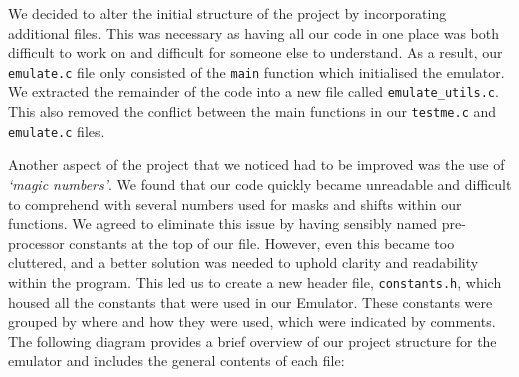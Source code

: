 \documentclass[10pt]{article}
\begin{document}
We decided to alter the initial structure of the project by incorporating additional files. This was necessary as having all our code in one place was both difficult to work on and difficult for someone else to understand. As a result, our {\tt emulate.c} file only consisted of the {\tt main} function which initialised the emulator. We extracted the remainder of the code into a new file called {\tt emulate\_utils.c}. This also removed the conflict between the main functions in our {\tt testme.c} and {\tt emulate.c} files.
 

Another aspect of the project that we noticed had to be improved was the use of \textsl{‘magic numbers’}. We found that our code quickly became unreadable and difficult to comprehend with several numbers used for masks and shifts within our functions. We agreed to eliminate this issue by having sensibly named pre-processor constants at the top of our file. However, even this became too cluttered, and a better solution was needed to uphold clarity and readability within the program. This led us to create a new header file, {\tt constants.h}, which housed all the constants that were used in our Emulator. These constants were grouped by where and how they were used, which were indicated by comments. The following diagram provides a brief overview of our project structure for the emulator and includes the
general contents of each file:

\vspace{0.5cm}
\end{document}
